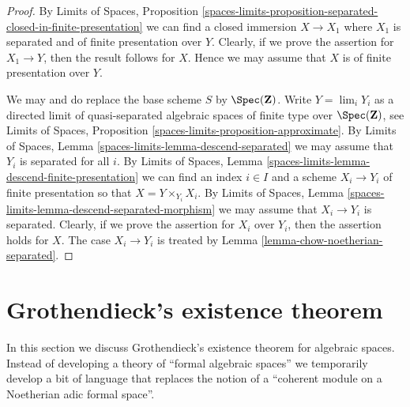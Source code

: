\begin{proof}
By
Limits of Spaces, Proposition
\ref{spaces-limits-proposition-separated-closed-in-finite-presentation}
we can find a closed immersion $X \to X_1$ where $X_1$ is separated
and of finite presentation over $Y$. Clearly, if we prove the assertion
for $X_1 \to Y$, then the result follows for $X$. Hence we may assume that
$X$ is of finite presentation over $Y$.

\medskip\noindent
We may and do replace the base scheme $S$ by $\Spec(\mathbf{Z})$.
Write $Y = \lim_i Y_i$ as a directed limit of
quasi-separated algebraic spaces of finite type over $\Spec(\mathbf{Z})$, see
Limits of Spaces,
Proposition \ref{spaces-limits-proposition-approximate}.
By Limits of Spaces, Lemma \ref{spaces-limits-lemma-descend-separated}
we may assume that $Y_i$ is separated for all $i$.
By
Limits of Spaces,
Lemma \ref{spaces-limits-lemma-descend-finite-presentation}
we can
find an index $i \in I$ and a scheme $X_i \to Y_i$ of finite presentation
so that $X = Y \times_{Y_i} X_i$.
By
Limits of Spaces,
Lemma \ref{spaces-limits-lemma-descend-separated-morphism}
we may assume that $X_i \to Y_i$ is separated.
Clearly, if we prove the assertion for
$X_i$ over $Y_i$, then the assertion holds for $X$. The case
$X_i \to Y_i$ is treated by
Lemma \ref{lemma-chow-noetherian-separated}.
\end{proof}






\section{Grothendieck's existence theorem}
\label{section-existence-proper}

\noindent
In this section we discuss Grothendieck's existence theorem for algebraic
spaces. Instead of developing a theory of ``formal algebraic spaces''
we temporarily develop a bit of language that replaces the notion of a
``coherent module on a Noetherian adic formal space''.

